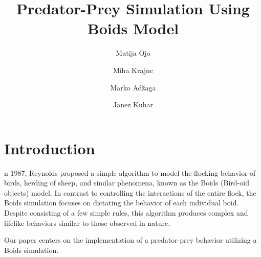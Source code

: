 \documentclass[9pt]{pnas-new}
\title{Predator-Prey Simulation Using Boids Model}
\author{Matija Ojo}
\author{Miha Krajnc}
\author{Marko Adžaga}
\author{Janez Kuhar}
\affil{Collective behaviour course research seminar report}
\begin{document}
\verticaladjustment{-2pt}

\maketitle
\thispagestyle{firststyle}

\section*{Introduction}

n 1987, Reynolds \cite{reynolds1987flocks} proposed a simple algorithm to model the
flocking behavior of birds, herding of sheep, and similar phenomena, known as the Boids (Bird-oid objects) model.
In contrast to controlling the interactions of the entire flock, the Boids simulation focuses on
dictating the behavior of each individual boid. Despite consisting of a few simple rules, this
algorithm produces complex and lifelike behaviors similar to those observed in nature.

Our paper centers on the implementation of a predator-prey behavior utilizing a Boids simulation.
\end{document}
